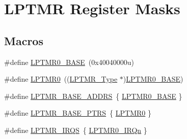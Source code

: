 \hypertarget{group___l_p_t_m_r___register___masks}{}\section{L\+P\+T\+MR Register Masks}
\label{group___l_p_t_m_r___register___masks}
\subsection*{Macros}
\begin{DoxyCompactItemize}
\item 
\#define \mbox{\hyperlink{group___l_p_t_m_r___register___masks_ga024f362857a8b928d96cf3b3f5106793}{L\+P\+T\+M\+R0\+\_\+\+B\+A\+SE}}~(0x40040000u)
\item 
\#define \mbox{\hyperlink{group___l_p_t_m_r___register___masks_gaba0c3bc8a32ad5a884c99e019dbdef85}{L\+P\+T\+M\+R0}}~((\mbox{\hyperlink{struct_l_p_t_m_r___type}{L\+P\+T\+M\+R\+\_\+\+Type}} $\ast$)\mbox{\hyperlink{group___l_p_t_m_r___register___masks_ga024f362857a8b928d96cf3b3f5106793}{L\+P\+T\+M\+R0\+\_\+\+B\+A\+SE}})
\item 
\#define \mbox{\hyperlink{group___l_p_t_m_r___register___masks_ga62b4c0fde534c2c09ef0c30b3c4bb0e3}{L\+P\+T\+M\+R\+\_\+\+B\+A\+S\+E\+\_\+\+A\+D\+D\+RS}}~\{ \mbox{\hyperlink{group___l_p_t_m_r___register___masks_ga024f362857a8b928d96cf3b3f5106793}{L\+P\+T\+M\+R0\+\_\+\+B\+A\+SE}} \}
\item 
\#define \mbox{\hyperlink{group___l_p_t_m_r___register___masks_gac92660dedc63be48d689d43efc9f2c82}{L\+P\+T\+M\+R\+\_\+\+B\+A\+S\+E\+\_\+\+P\+T\+RS}}~\{ \mbox{\hyperlink{group___l_p_t_m_r___register___masks_gaba0c3bc8a32ad5a884c99e019dbdef85}{L\+P\+T\+M\+R0}} \}
\item 
\#define \mbox{\hyperlink{group___l_p_t_m_r___register___masks_ga5bf0032641d320fc7d486d703800c729}{L\+P\+T\+M\+R\+\_\+\+I\+R\+QS}}~\{ \mbox{\hyperlink{group___interrupt__vector__numbers_gga666eb0caeb12ec0e281415592ae89083a93853a8a41060ac37aa92ae9ee472c6e}{L\+P\+T\+M\+R0\+\_\+\+I\+R\+Qn}} \}
\end{DoxyCompactItemize}
